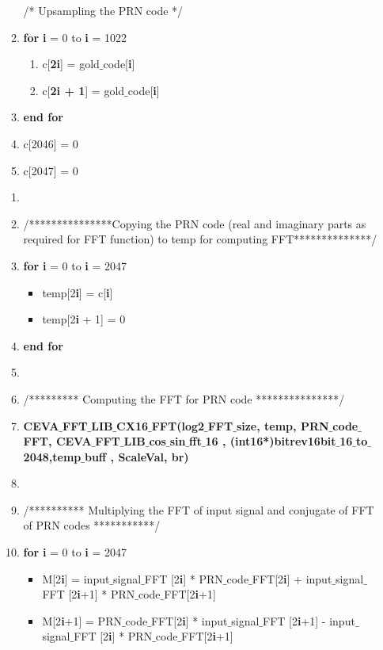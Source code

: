 \documentclass[journal,10pt,onecolumn]{article}
\begin{document}
\begin{enumerate}
\begin{enumerate}
    /* Upsampling the PRN code */
        \item[] \textbf{for} \textbf{i} = 0 to \textbf{i} = 1022
        \begin{enumerate}
            \item[] c[\textbf{2i}] = gold$\_$code[\textbf{i}]
            \item[] c[\textbf{2i + 1}] = gold$\_$code[\textbf{i}]
        \end{enumerate}
        \item[] \textbf{end for}
        \item[] c[2046] = 0
        \item[] c[2047] = 0
    \end{enumerate}
    
    \begin{enumerate}
    \item[]
    \item[] /***************Copying the PRN code (real and imaginary parts as required for FFT function) to temp for computing FFT**************/
    \item[] \textbf{for} \textbf{i} = 0 to \textbf{i} = 2047
    \begin{itemize}
        \item[] temp[2\textbf{i}]     =  c[\textbf{i}]
        \item[] temp[2\textbf{i} + 1] =  0
    \end{itemize}
    \item[] \textbf{end for}
    \item[] 
    \item[] /********* Computing the FFT for PRN code ***************/
    \item[] \textbf{CEVA$\_$FFT$\_$LIB$\_$CX16$\_$FFT(log2$\_$FFT$\_$size, temp, PRN$\_$code$\_$FFT, CEVA$\_$FFT$\_$LIB$\_$cos$\_$sin$\_$fft$\_$16 , (int16*)bitrev16bit$\_$16$\_$to$\_$2048,temp$\_$buff , ScaleVal, br)}
    \item[]
    \item[] /********** Multiplying the FFT of input signal and conjugate of FFT of PRN codes ***********/
    \item[] \textbf{for} \textbf{i} = 0 to \textbf{i} = 2047
    \begin{itemize}
        \item[] M[2\textbf{i}]   = input$\_$signal$\_$FFT [2\textbf{i}] * PRN$\_$code$\_$FFT[2\textbf{i}] + input$\_$signal$\_$FFT [2\textbf{i}+1] * PRN$\_$code$\_$FFT[2\textbf{i}+1]
        \item[] M[2\textbf{i}+1] = PRN$\_$code$\_$FFT[2\textbf{i}] * input$\_$signal$\_$FFT [2\textbf{i}+1] - input$\_$signal$\_$FFT [2\textbf{i}] * PRN$\_$code$\_$FFT[2\textbf{i}+1]

\end{itemize}
\end{enumerate}
\end{enumerate}
\end{document}
